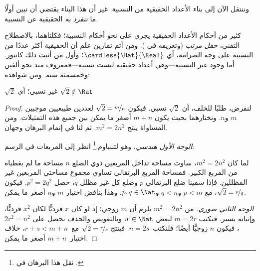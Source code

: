 \documentclass[../../../include/open-logic-section]{subfiles}
\begin{document}

وننتقل الآن إلى بناء الأعداد الحقيقية من النسبية. غير أن هذا البناء يقتضي أن نبين أولًا ما \emph{تنفرد به} الحقيقية عن النسبية.

كثير من أحكام الأعداد الحقيقية يجري على نحو أحكام النسبية؛ فكلتاهما، بالاصطلاح التقني، \emph{حقل مرتب} (وتعريفه في ). ومن أتم تمارين  علم أن الحقيقية أكثر عددًا من النسبية على وجه الصرامة، أي $\cardless{\Rat}{\Real}$؛ وأول من أثبت ذلك كانتور. أما وجود غير النسبية---وهي أعداد حقيقية ليست نسبية---فمعروف منذ نحو ألفين وخمسمئة سنة. ومن شواهده:
\begin{thm}
$\sqrt{2}$ غير نسبي؛ أي $\sqrt{2} \notin \Rat$
\end{thm}

\begin{proof}
لنفرض، طلبًا للخلف، أن $\sqrt{2}$ نسبي. فيكون $\sqrt{2} =
\nicefrac{m}{n}$ لعددين طبيعيين موجبين $m$ و$n$. ونختارهما بحيث يكون
$m+n$ أصغر ما يمكن بين جميع هذه التمثيلات. ومن المساواة ينتج
$m^{2} = 2n^{2}$. ثم لنا في إتمام البرهان وجهان.

\emph{الوجه الأول هندسي}، وهو لتننباوم.\footnote{نقل هذا البرهان في \cite{Conway2006}.} انظر إلى المربعات في الرسم:
\begin{center}
\end{center}
لما كان $m^2 = 2n^2$، ساوت مساحة تداخل المربعين ذوي الضلع $n$ مساحة ما لم يغطياه من المربع الكبير. فمساحة المربع البرتقالي تساوي مجموع مساحتي المربعين غير المظللين. فإذا سمينا ضلع البرتقالي $p$ وضلع كل غير مظلل $q$، حصل $p^2 = 2q^2$. فيكون $\sqrt{2} = \nicefrac{p}{q}$، مع $p < m$ و$q < n$ و$p, q \in
\Nat$. وهذا يناقض اختيار $m$ و$n$ أصغر ما يمكن.

\emph{الوجه الثاني صوري.} من $m^{2} = 2n^{2}$ يلزم أن $m$ زوجي؛ إذ لو كان $x$ فرديًّا لكان $x^2$ فرديًّا، وإثباته يسير. فنكتب $m = 2r$ لبعض $r \in \Nat$، وبالتعويض والحذف نحصل على $2r^2 = n^2$،
فيكون $n$ زوجيًّا أيضًا؛ فلنكتب~$n=2s$. فينتج
$\sqrt{2}=\nicefrac{r}{s}$ مع~$r+s<m+n$، خلاف اختيار~$m+n$ أصغر ما يمكن.
\end{proof}
\end{document}
